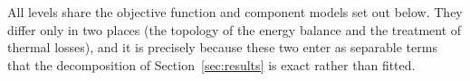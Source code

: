 
All levels share the objective function and component models set out below. They differ
only in two places (the topology of the energy balance and the treatment of thermal
losses), and it is precisely because these two enter as separable terms that the
decomposition of Section~\ref{sec:results} is exact rather than fitted.

